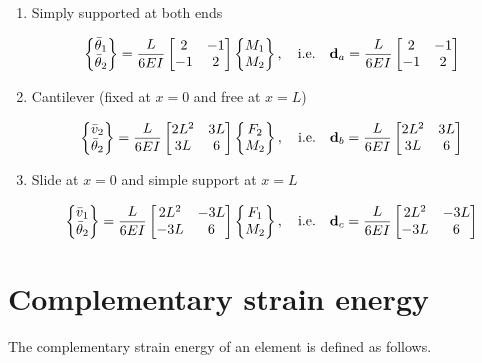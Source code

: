 \begin{enumerate}[label=(\alph*),leftmargin=*]
  \item Simply supported at both ends
    \begin{fig}
      
    \end{fig}
    \begin{equation}
      \begin{Bmatrix}\bar\theta_1\\ \bar\theta_2\end{Bmatrix} = \frac{L}{6EI}\begin{bmatrix}2 & -1\\ -1 & 2\end{bmatrix}\begin{Bmatrix}M_1\\ M_2\end{Bmatrix},\quad\text{i.e.}\quad \mathbf{d}_a = \frac{L}{6EI}\begin{bmatrix}2 & -1\\ -1 & 2\end{bmatrix}
    \end{equation}
  \item Cantilever (fixed at $x = 0$ and free at $x = L$)
    \begin{fig}
      
    \end{fig}
    \begin{equation}
      \begin{Bmatrix}\bar v_2\\ \bar\theta_2\end{Bmatrix} = \frac{L}{6EI}\begin{bmatrix}2L^2 & 3L\\ 3L & 6\end{bmatrix}\begin{Bmatrix}F_2\\ M_2\end{Bmatrix},\quad\text{i.e.}\quad \mathbf{d}_b = \frac{L}{6EI}\begin{bmatrix}2L^2 & 3L\\ 3L & 6\end{bmatrix}
    \end{equation}
  \item Slide at $x = 0$ and simple support at $x = L$
    \begin{fig}
      
    \end{fig}
    \begin{equation}
      \begin{Bmatrix}\bar v_1\\ \bar\theta_2\end{Bmatrix} = \frac{L}{6EI}\begin{bmatrix}2L^2 & -3L\\ -3L & 6\end{bmatrix}\begin{Bmatrix}F_1\\ M_2\end{Bmatrix},\quad\text{i.e.}\quad \mathbf{d}_c = \frac{L}{6EI}\begin{bmatrix}2L^2 & -3L\\ -3L & 6\end{bmatrix}
    \end{equation}
\end{enumerate}

\section{Complementary strain energy}
The complementary strain energy of an element is defined as follows.

